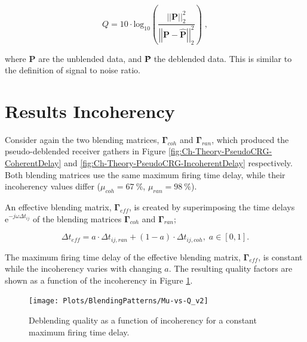 \begin{equation}
	Q = 10 \cdot \mathrm{log_{10}} \left( \frac{\left|\left|\mathbf{P}\right|\right| _2 ^2}{\left|\left|\mathbf{P - \hat{P}}\right|\right| _2 ^2} \right) \;,	
\end{equation}

where $\mathbf{P}$ are the unblended data, and \textbf{\^{P}} the deblended data. This is similar to the definition of signal to noise ratio. 





\section{Results Incoherency}

Consider again the two blending matrices, $\mathbf{\Gamma}_{coh}$ and $\mathbf{\Gamma}_{ran}$, which produced the pseudo-deblended receiver gathers in Figure \ref{fig:Ch-Theory-PseudoCRG-CoherentDelay} and \ref{fig:Ch-Theory-PseudoCRG-IncoherentDelay} respectively. Both blending matrices use the same maximum firing time delay, while their incoherency values differ ($\mu_{coh} = \SI{67}{\percent}$, $\mu_{ran} = \SI{98}{\percent}$). 

An effective blending matrix, $\mathbf{\Gamma}_{eff}$, is created by superimposing the time delays $\mathrm{e}^{-j \omega \Delta t_{ij}}$ of the blending matrices $\mathbf{\Gamma}_{coh}$ and $\mathbf{\Gamma}_{ran}$;

\begin{equation}
	\Delta t_{eff} = a \cdot \Delta t_{ij,ran} + (1 - a) \cdot \Delta t_{ij,coh}, \; a \in [0,1].
	\label{eq:Ch-Incoherency-EffectiveG}
\end{equation}


The maximum firing time delay of the effective blending matrix, $\mathbf{\Gamma}_{eff}$, is constant while the incoherency  varies with changing $a$. The resulting quality factors are shown as a function of the incoherency in Figure \ref{fig:Ch-Results-Quality-vs-Incoherency}.


\begin{figure}
	\centering
	\texttt{[image: Plots/BlendingPatterns/Mu-vs-Q\_v2]}
	\caption{Deblending quality as a function of incoherency for a constant maximum firing time delay.}
	\label{fig:Ch-Results-Quality-vs-Incoherency}
\end{figure}

